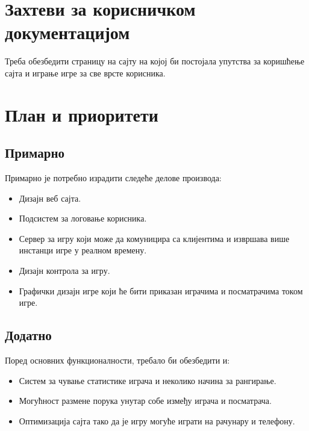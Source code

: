 \section{Захтеви за корисничком документацијом}
Треба обезбедити страницу на сајту на којој би постојала упутства за коришћење сајта и играње игре за све врсте корисника.

\section{План и приоритети}

\subsection{Примарно}
Примарно је потребно израдити следеће делове производа:
\begin{itemize}

\item Дизајн веб сајта.

\item Подсистем за логовање корисника.

\item Сервер за игру који може да комуницира са клијентима и извршава више инстанци игре у реалном времену.

\item Дизајн контрола за игру.

\item Графички дизајн игре који ће бити приказан играчима и посматрачима током игре.

\end{itemize}

\subsection{Додатно}
Поред основних функционалности, требало би обезбедити и:
\begin{itemize}
    
    \item Систем за чување статистике играча и неколико начина за рангирање.

    \item Могућност размене порука унутар собе између играча и посматрача.

\item Оптимизација сајта тако да је игру могуће играти на рачунару и телефону.    
\end{itemize}
